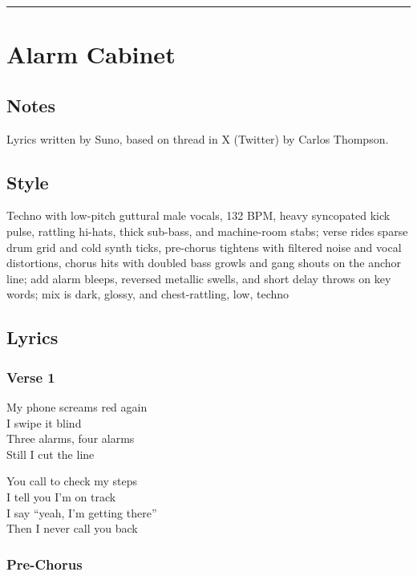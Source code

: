 \begin{center}\rule{0.5\linewidth}{0.5pt}\end{center}

\section{Alarm Cabinet}\label{alarm-cabinet}

\subsection{Notes}\label{notes-8}

Lyrics written by Suno, based on thread in X (Twitter) by Carlos
Thompson.

\subsection{Style}\label{style-8}

Techno with low-pitch guttural male vocals, 132 BPM, heavy syncopated
kick pulse, rattling hi-hats, thick sub-bass, and machine-room stabs;
verse rides sparse drum grid and cold synth ticks, pre-chorus tightens
with filtered noise and vocal distortions, chorus hits with doubled bass
growls and gang shouts on the anchor line; add alarm bleeps, reversed
metallic swells, and short delay throws on key words; mix is dark,
glossy, and chest-rattling, low, techno

\subsection{Lyrics}\label{lyrics-8}

\subsubsection{Verse 1}\label{verse-1-4}

My phone screams red again\\
I swipe it blind\\
Three alarms, four alarms\\
Still I cut the line

You call to check my steps\\
I tell you I'm on track\\
I say ``yeah, I'm getting there''\\
Then I never call you back

\subsubsection{Pre-Chorus}\label{pre-chorus-6}

